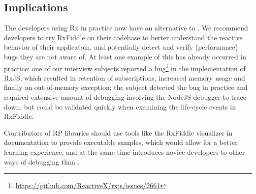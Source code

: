 \subsection{Implications}
The developers using Rx in practice now have an alternative to \printfdebugging{}. 
We recommend developers to try RxFiddle on their codebase to better understand the reactive behavior of their applicatoin, 
and potentially detect and verify (performance) bugs they are not aware of.
At least one example of this has already occurred in practice:
one of our interview subjects reported a bug\footnote{\url{https://github.com/ReactiveX/rxjs/issues/2661}} in the  implementation of RxJS,
which resulted in retention of subscriptions, increased memory usage and finally an out-of-memory exception;
the subject detected the bug in practice and required extensive amount of debugging involving the NodeJS debugger to trace down,
but could be validated quickly when examining the life-cycle events in RxFiddle.

Contributors of RP libraries should use tools like the RxFiddle visualizer in documentation to provide executable samples,
which would allow for a better learning experience, 
and at the same time introduces novice developers to other ways of debugging than \printfdebugging{}.
